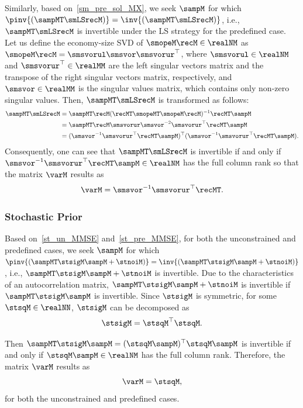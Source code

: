 \documentclass[journal]{IEEEtran}
\begin{document}
Similarly, based on~\eqref{sm_pre_sol_MX}, we seek $\sampM$ for which $\pinv{(\sampMT \smLSrecM)} = \inv{(\sampMT \smLSrecM)}$, i.e., $\sampMT \smLSrecM$ is invertible under the LS strategy for the predefined case.
Let us define the economy-size SVD of $\smopeM \recM \in \realNM$ as $\smopeM \recM = \smsvorul \smsvor \smsvorur^{\top}$, where $\smsvorul \in \realNM$ and $\smsvorur^{\top} \in \realMM$ are the left singular vectors matrix and the transpose of the right singular vectors matrix, respectively, and $\smsvor \in \realMM$ is the singular values matrix, which contains only non-zero singular values.
Then, $\sampMT \smLSrecM$ is transformed as follows:
\begin{align}
    \sampMT \smLSrecM &= \sampMT \recM (\recMT \smopeMT \smopeM \recM)^{-1} \recMT \sampM \nonumber \\
    &= \sampMT \recM \smsvorur \smsvor^{-2} \smsvorur^{\top} \recMT \sampM \nonumber \\
    &= (\smsvor^{-1} \smsvorur^{\top} \recMT \sampM)^{\top} (\smsvor^{-1} \smsvorur^{\top} \recMT \sampM).
\end{align}
Consequently, one can see that $\sampMT \smLSrecM$ is invertible if and only if $\smsvor^{-1} \smsvorur^{\top} \recMT \sampM \in \realNM$ has the full column rank so that the matrix $\varM$ results as
\begin{equation}
    \varM = \smsvor^{-1} \smsvorur^{\top} \recMT.
\end{equation}

\subsubsection{Stochastic Prior}
Based on~\eqref{st_un_MMSE} and~\eqref{st_pre_MMSE}, for both the unconstrained and predefined cases, we seek $\sampM$ for which $\pinv{(\sampMT\stsigM\sampM + \stnoiM)} = \inv{(\sampMT\stsigM\sampM + \stnoiM)}$, i.e., $\sampMT\stsigM\sampM + \stnoiM$ is invertible.
Due to the characteristics of an autocorrelation matrix, $\sampMT\stsigM\sampM + \stnoiM$ is invertible if $\sampMT\stsigM\sampM$ is invertible.
Since $\stsigM$ is symmetric, for some $\stsqM \in \realNN$, $\stsigM$ can be decomposed as
\begin{equation}
    \stsigM = \stsqM^\top \stsqM.
\end{equation}

Then $\sampMT\stsigM\sampM = (\stsqM \sampM)^\top \stsqM \sampM$ is invertible if and only if $\stsqM \sampM \in \realNM$ has the full column rank.
Therefore, the matrix $\varM$ results as 
\begin{equation}
    \varM = \stsqM,
\end{equation}
for both the unconstrained and predefined cases.
\end{document}
